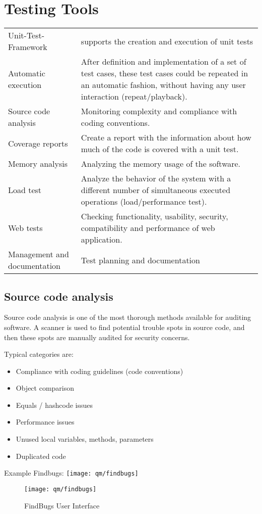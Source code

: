 %
%
\chapter{Testing Tools}
\begin{tabularx}{\linewidth}{l|X}
 Unit-Test-Framework & supports the creation and execution of unit tests\\
 Automatic execution  & After definition and implementation of a set of
 test cases, these test cases could be repeated in an automatic fashion,
 without having any user interaction (repeat/playback).\\
Source code analysis & Monitoring complexity and compliance with coding
conventions.\\
Coverage reports & Create a report with the information about how much of the
code is covered with a unit test.\\
Memory analysis & Analyzing the memory usage of the software.\\
 Load test & Analyze the behavior of the system with a different number of
 simultaneous executed operations (load/performance test).\\
 Web tests & Checking functionality, usability, security,
 compatibility and performance of web application.\\
 Management and documentation & Test planning and documentation \\
\end{tabularx}
\newpage
\section{Source code analysis}
Source code analysis is one of the most thorough methods
available for auditing software. A scanner is used to find
potential trouble spots in source code, and then these spots are
manually audited for security concerns.

Typical categories are:
\begin{itemize}
\item Compliance with coding guidelines (code conventions)
\item Object comparison
\item Equals / hashcode issues
\item Performance issues
\item Unused local variables, methods, parameters
\item Duplicated code
\end{itemize}
%
Example Findbugs:
\ifslides
\texttt{[image: qm/findbugs]}
\else
\begin{figure}[H]
\centering
\texttt{[image: qm/findbugs]}
\caption{FindBugs User Interface}
\end{figure}
\fi
%
\newslide
